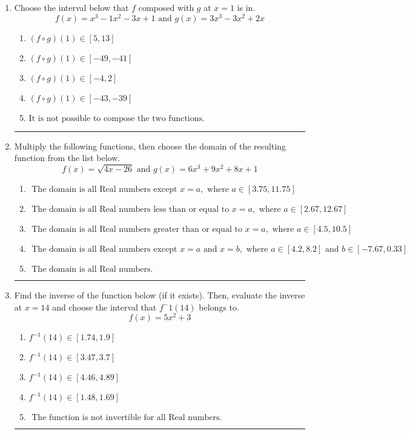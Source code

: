 \documentclass[14pt]{extbook}
\newcommand{\litem}[1]{\item#1\hspace*{-1cm}\rule{\textwidth}{0.4pt}}
\begin{document}
\begin{enumerate}
{\begin{enumerate}[label=\Alph*.]
\end{enumerate} }
\litem{
Choose the interval below that $f$ composed with $g$ at $x=1$ is in.\[ f(x) = x^{3} -1 x^{2} -3 x + 1 \text{ and } g(x) = 3x^{3} -3 x^{2} +2 x \]\begin{enumerate}[label=\Alph*.]
\item \( (f \circ g)(1) \in [5, 13] \)
\item \( (f \circ g)(1) \in [-49, -41] \)
\item \( (f \circ g)(1) \in [-4, 2] \)
\item \( (f \circ g)(1) \in [-43, -39] \)
\item \( \text{It is not possible to compose the two functions.} \)

\end{enumerate} }
\litem{
Multiply the following functions, then choose the domain of the resulting function from the list below.\[ f(x) = \sqrt{4x-26}  \text{ and } g(x) = 6x^{3} +9 x^{2} +8 x + 1 \]\begin{enumerate}[label=\Alph*.]
\item \( \text{ The domain is all Real numbers except } x = a, \text{ where } a \in [3.75, 11.75] \)
\item \( \text{ The domain is all Real numbers less than or equal to } x = a, \text{ where } a \in [2.67, 12.67] \)
\item \( \text{ The domain is all Real numbers greater than or equal to } x = a, \text{ where } a \in [4.5, 10.5] \)
\item \( \text{ The domain is all Real numbers except } x = a \text{ and } x = b, \text{ where } a \in [4.2, 8.2] \text{ and } b \in [-7.67, 0.33] \)
\item \( \text{ The domain is all Real numbers. } \)

\end{enumerate} }
\litem{
Find the inverse of the function below (if it exists). Then, evaluate the inverse at $x = 14$ and choose the interval that $f^-1(14)$ belongs to.\[ f(x) = 5 x^2 + 3 \]\begin{enumerate}[label=\Alph*.]
\item \( f^{-1}(14) \in [1.74, 1.9] \)
\item \( f^{-1}(14) \in [3.47, 3.7] \)
\item \( f^{-1}(14) \in [4.46, 4.89] \)
\item \( f^{-1}(14) \in [1.48, 1.69] \)
\item \( \text{ The function is not invertible for all Real numbers. } \)


\end{enumerate}}
\end{enumerate}
\end{document}
